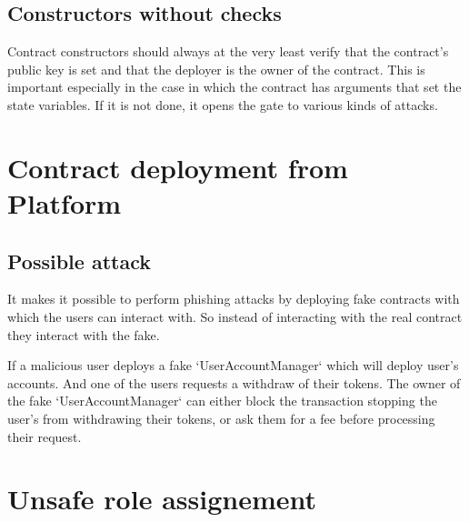 \subsection{Constructors without checks}
\label{constructor:check}

Contract constructors should always at the very least verify that the contract's public key is set and that the deployer is the owner of the contract. This is important especially in the case in which the contract has arguments that set the state variables. If it is not done, it opens the gate to various kinds of attacks.

\section{Contract deployment from Platform}


\subsection{Possible attack}

It makes it possible to perform phishing attacks by deploying fake contracts with which the users can interact with. So instead of interacting with the real contract they interact with the fake. 

If a malicious user deploys a fake `UserAccountManager` which will deploy user's accounts. And one of the users requests a withdraw of their tokens. The owner of the fake `UserAccountManager` can either block the transaction stopping the user's from withdrawing their tokens, or ask them for a fee before processing their request.


\section{Unsafe role assignement}

